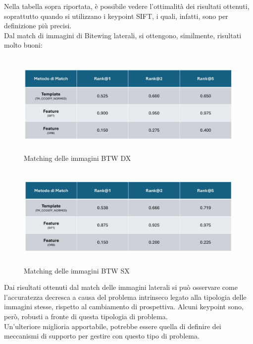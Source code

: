 \documentclass[12pt,a4paper,openright,twoside]{book}
\begin{document}
Nella tabella sopra riportata, è possibile vedere l'ottimalità dei risultati ottenuti, soprattutto quando si utilizzano i keypoint SIFT, i quali, infatti, sono per definizione più precisi. \\
Dal match di immagini di Bitewing laterali, si ottengono, similmente, risultati molto buoni:
\begin{figure}[H]
	\centering
	\includegraphics[height=5cm,width=15cm]{figures/dxprof.pdf}
    	\caption{Matching delle immagini BTW DX}
	\label{fig:dxprof}
\end{figure}
\begin{figure}[H]
	\centering
	\includegraphics[height=5cm,width=15cm]{figures/sxprof.pdf}
    	\caption{Matching delle immagini BTW SX}
	\label{fig:sxprof}
\end{figure}

Dai risultati ottenuti dal match delle immagini laterali si può osservare come l'accuratezza decresca a causa del problema intrinseco legato alla tipologia delle immagini stesse, rispetto al cambiamento di prospettiva. Alcuni keypoint sono, però, robusti a fronte di questa tipologia di problema.\\
Un'ulteriore miglioria apportabile, potrebbe essere quella di definire dei meccanismi di supporto per gestire con questo tipo di problema. 
\end{document}
